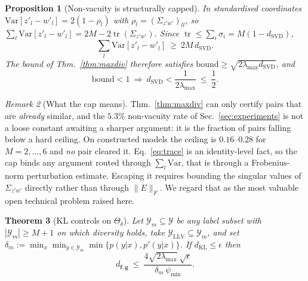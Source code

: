 \documentclass[10pt,letterpaper,twocolumn]{article}
\newcommand{\Y}{\mathcal{Y}}
\newcommand{\bff}{\mathbf{f}}
\newcommand{\bfg}{\mathbf{g}}
\newcommand{\dKL}{d_{\mathrm{KL}}}
\newcommand{\dSVD}{d_{\mathrm{SVD}}}
\newcommand{\dfg}{d_{\bff,\bfg}}
\newcommand{\Var}{\mathrm{Var}}
\newcommand{\Thetadelta}{\Theta_{\delta}}
\theoremstyle{plain}
\newtheorem{theorem}{Theorem}
\newtheorem{proposition}[theorem]{Proposition}
\theoremstyle{definition}
\theoremstyle{remark}
\newtheorem{remark}[theorem]{Remark}
\begin{document}
\begin{proposition}[Non-vacuity is structurally capped]
\label{prop:ceiling}
In standardised coordinates $\Var[z'_{l}-w'_{l}]=2(1-\rho_{l})$ with
$\rho_{l}=(\Sigma_{z'w'})_{ll}$, so
$\sum_{l}\Var[z'_{l}-w'_{l}]=2M-2\operatorname{tr}(\Sigma_{z'w'})$. Since
$\operatorname{tr}\le\sum_{i}\sigma_{i}=M(1-\dSVD)$,
\begin{equation}
\textstyle\sum_{l}\Var[z'_{l}-w'_{l}]\ \ge\ 2M\,\dSVD .
\label{eq:trace}
\end{equation}
The bound of Thm.~\ref{thm:maxdiv} therefore satisfies
$\text{bound}\ge\sqrt{2\lambda_{\max}\dSVD}$, and
\begin{equation}
\text{bound}<1\ \Longrightarrow\ \dSVD<\frac{1}{2\lambda_{\max}}\ \le\ \frac12 .
\label{eq:nvcap}
\end{equation}
\end{proposition}

\begin{remark}[What the cap means]
\label{rem:cap}
Thm.~\ref{thm:maxdiv} can only certify pairs that are \emph{already} similar,
and the $5.3\%$ non-vacuity rate of Sec.~\ref{sec:experiments} is not a loose
constant awaiting a sharper argument: it is the fraction of pairs falling below
a hard ceiling. On constructed models the ceiling is $0.16$--$0.28$ for
$M=2,\dots,6$ and \emph{no} pair cleared it. Eq.~\eqref{eq:trace} is an
identity-level fact, so the cap binds any argument routed through
$\sum_{l}\Var$, that is through a Frobenius-norm perturbation estimate.
Escaping it requires bounding the singular values of $\Sigma_{z'w'}$ directly
rather than through $\|E\|_{F}$. We regard that as the most valuable open
technical problem raised here.
\end{remark}

\begin{theorem}[KL controls on $\Thetadelta$]
\label{thm:klcond}
Let $\Y_{m}\subseteq\Y$ be any label subset with $|\Y_{m}|\ge M+1$ on which
diversity holds, take $\mathcal{Y}_{\mathrm{LLV}}\subseteq\Y_{m}$, and set
$\delta_{m}:=\min_{x}\min_{y\in\Y_{m}}\min\{p(y|x),p'(y|x)\}$. If
$\dKL\le\epsilon$ then
\begin{equation}
\dfg\ \le\ \frac{4\sqrt{2\lambda_{\max}}\ \sqrt{\epsilon}}
{\delta_{m}\,\psi_{\min}} .
\label{eq:klbound}
\end{equation}
\end{theorem}
\end{document}
